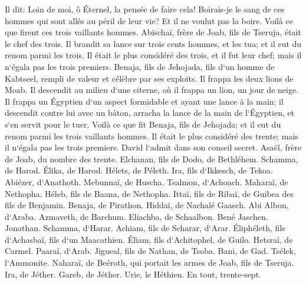 \verse Il dit: Loin de moi, ô Éternel, la pensée de faire cela! Boirais-je le sang de ces hommes qui sont allés au péril de leur vie? Et il ne voulut pas la boire. Voilà ce que firent ces trois vaillants hommes. 
\verse Abischaï, frère de Joab, fils de Tseruja, était le chef des trois. Il brandit sa lance sur trois cents hommes, et les tua; et il eut du renom parmi les trois. 
\verse Il était le plus considéré des trois, et il fut leur chef; mais il n`égala pas les trois premiers. 
\verse Benaja, fils de Jehojada, fils d`un homme de Kabtseel, rempli de valeur et célèbre par ses exploits. Il frappa les deux lions de Moab. Il descendit au milieu d`une citerne, où il frappa un lion, un jour de neige. 
\verse Il frappa un Égyptien d`un aspect formidable et ayant une lance à la main; il descendit contre lui avec un bâton, arracha la lance de la main de l`Égyptien, et s`en servit pour le tuer. 
\verse Voilà ce que fit Benaja, fils de Jehojada; et il eut du renom parmi les trois vaillants hommes. 
\verse Il était le plus considéré des trente; mais il n`égala pas les trois premiers. David l`admit dans son conseil secret. 
\verse Asaël, frère de Joab, du nombre des trente. Elchanan, fils de Dodo, de Bethléhem. 
\verse Schamma, de Harod. Élika, de Harod. 
\verse Hélets, de Péleth. Ira, fils d`Ikkesch, de Tekoa. 
\verse Abiézer, d`Anathoth. Mebunnaï, de Huscha. 
\verse Tsalmon, d`Achoach. Maharaï, de Nethopha. 
\verse Héleb, fils de Baana, de Nethopha. Ittaï, fils de Ribaï, de Guibea des fils de Benjamin. 
\verse Benaja, de Pirathon. Hiddaï, de Nachalé Gaasch. 
\verse Abi Albon, d`Araba. Azmaveth, de Barchum. 
\verse Eliachba, de Schaalbon. Bené Jaschen. Jonathan. 
\verse Schamma, d`Harar. Achiam, fils de Scharar, d`Arar. 
\verse Éliphéleth, fils d`Achasbaï, fils d`un Maacathien. Éliam, fils d`Achitophel, de Guilo. 
\verse Hetsraï, de Carmel. Paaraï, d`Arab. 
\verse Jigueal, fils de Nathan, de Tsoba. Bani, de Gad. 
\verse Tsélek, l`Ammonite. Naharaï, de Beéroth, qui portait les armes de Joab, fils de Tseruja. 
\verse Ira, de Jéther. Gareb, de Jéther. 
\verse Urie, le Héthien. En tout, trente-sept. 

